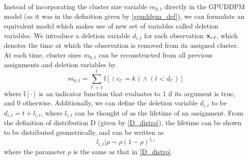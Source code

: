 \documentclass[twocolumn, final]{svjour3}
\begin{document}
Instead of incorporating the cluster size variable $m_{k,t}$ directly in the GPUDDPM model (as it was in the definition given by \eqref{gpuddpm_def}), we can formulate an equivalent model which makes use of new set of variables called deletion variables. We introduce a deletion variable $d_{i,t}$ for each observation $\bold{x}_{i,t}$, which denotes the time at which the observation is removed from its assigned cluster. At each time, cluster sizes $m_{k,t}$ can be reconstructed from all previous assignments and deletion variables by
\begin{equation}
\label{compute_clust_size}
m_{k,t} = \sum_{t' = 1}^{t} \mathbb{I}[(c_{t'}=k) \wedge (t < d_{t'})]
\end{equation}
where $\mathbb{I}[\cdot]$ is an indicator function that evaluates to 1 if its argument is true, and 0 otherwise. Additionally, we can define the deletion variable $d_{i,t}$ to be $d_{i,t} = t + l_{i,t}$, where $l_{i,t}$ can be thought of as the lifetime of an assignment. From the definition of distribution D (given by \eqref{D_distro}), the lifetime can be shown to be distributed geometrically, and can be written as
\begin{equation}
\label{del_rho_form}
l_{i,t} | \rho  \sim  \rho(1 - \rho)^{l_{i,t}}
\end{equation}
where the parameter $\rho$ is the same as that in \eqref{D_distro}.
\end{document}
